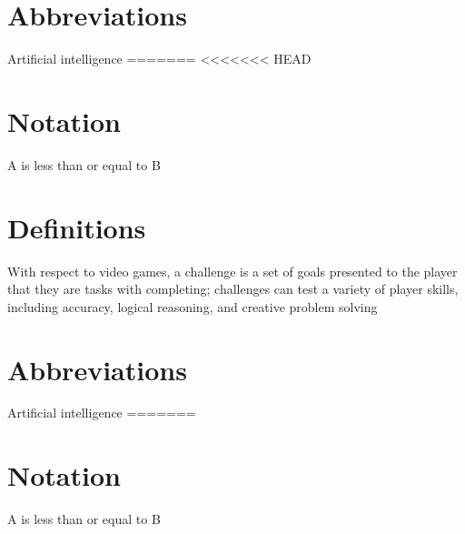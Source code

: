 \section*{Abbreviations}
\begin{description}[font=\rmfamily\bfseries, leftmargin=3cm, style=nextline]
	\item[AI] Artificial intelligence
=======
<<<<<<< HEAD

\section*{Notation}
\begin{description}[font=\rmfamily\bfseries, leftmargin=3cm, style=nextline]
	\item[$A \leq B$] A is less than or equal to B
\end{description}

\section*{Definitions}
\begin{description}[font=\rmfamily\bfseries, leftmargin=3cm, style=nextline]
	\item[Challenge] With respect to video games, a challenge is a set of goals presented to the player that they are tasks with completing; challenges can test a variety of player skills, including accuracy, logical reasoning, and creative problem solving
\end{description}

\section*{Abbreviations}
\begin{description}[font=\rmfamily\bfseries, leftmargin=3cm, style=nextline]
	\item[AI] Artificial intelligence
=======

\section*{Notation}
\begin{description}[font=\rmfamily\bfseries, leftmargin=3cm, style=nextline]
	\item[$A \leq B$] A is less than or equal to B
\end{description}


\end{description}
\end{description}
